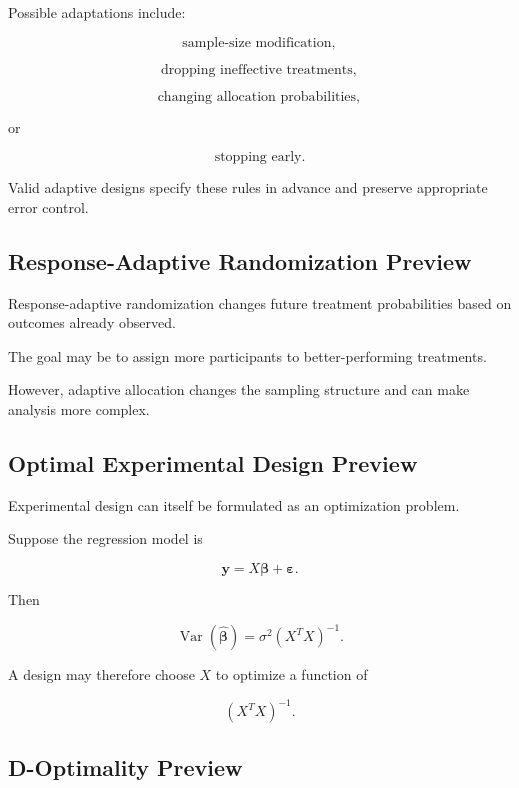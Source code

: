 Possible adaptations include:

\[
\boxed{
\text{sample-size modification},
}
\]

\[
\boxed{
\text{dropping ineffective treatments},
}
\]

\[
\boxed{
\text{changing allocation probabilities},
}
\]

or

\[
\boxed{
\text{stopping early}.
}
\]

Valid adaptive designs specify these rules in advance and preserve
appropriate error control.

\subsection{Response-Adaptive Randomization Preview}
\label{subsec:response-adaptive-randomization}

Response-adaptive randomization changes future treatment probabilities
based on outcomes already observed.

The goal may be to assign more participants to better-performing
treatments.

However, adaptive allocation changes the sampling structure and can make
analysis more complex.

\subsection{Optimal Experimental Design Preview}
\label{subsec:optimal-experimental-design-preview}

Experimental design can itself be formulated as an optimization problem.

Suppose the regression model is

\[
\mathbf{y}
=
X\boldsymbol{\beta}
+
\boldsymbol{\varepsilon}.
\]

Then

\[
\operatorname{Var}
(
\widehat{\boldsymbol{\beta}}
)
=
\sigma^2
(X^TX)^{-1}.
\]

A design may therefore choose \(X\) to optimize a function of

\[
(X^TX)^{-1}.
\]

\subsection{D-Optimality Preview}
\label{subsec:d-optimality-preview}


